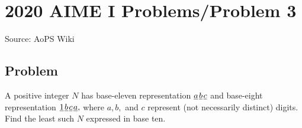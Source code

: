\documentclass[12pt]{article}
\begin{document}
\section*{{2020 AIME I Problems/Problem 3}}
Source: AoPS Wiki

\subsection*{Problem}
A positive integer $N$ has base-eleven representation $\underline{a}\kern 0.1em\underline{b}\kern 0.1em\underline{c}$ and base-eight representation $\underline1\kern 0.1em\underline{b}\kern 0.1em\underline{c}\kern 0.1em\underline{a},$ where $a,b,$ and $c$ represent (not necessarily distinct) digits. Find the least such $N$ expressed in base ten.
\end{document}
